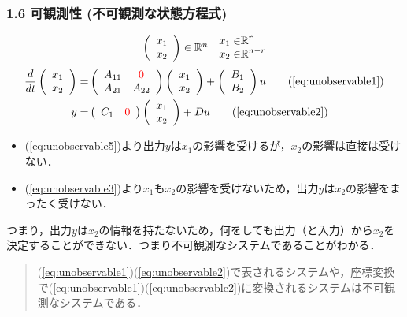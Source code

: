 \begin{frame}[t]
\frametitle{1.6 可観測性 (不可観測な状態方程式)}

\begin{align}
  \begin{array}{cc}
    \left(
      \begin{array}{c}
         x_1 \\  x_2
      \end{array}
    \right)\in \mathbb{R}^{n} &
    \begin{aligned}
       x_1 \in& \mathbb{R}^r \\
       x_2 \in& \mathbb{R}^{n-r} \\
    \end{aligned}
  \end{array} \notag
\end{align}
\begin{align}
  \frac{d}{dt}
  \left(
    \begin{array}{c}
      x_1 \\ x_2
    \end{array}
  \right) =& \left(
    \begin{array}{cc}
      A_{11} & \textcolor{red}{0} \\ A_{21} & A_{22}
    \end{array}
  \right)
  \left(
    \begin{array}{c}
      x_1 \\ x_2
    \end{array}
  \right) +
  \left(
    \begin{array}{c}
      B_1 \\ B_2
    \end{array}
  \right) u \tag{\ref{eq:unobservable1}}\\
  y =& \left(
    \begin{array}{cc}
      C_1 & \textcolor{red}{0}
    \end{array}
  \right)
  \left(
    \begin{array}{c}
      x_1 \\ x_2
    \end{array}
  \right) + D u \tag{\ref{eq:unobservable2}}
\end{align}
\begin{itemize}
\item (\ref{eq:unobservable5})より出力$y$は$x_1$の影響を受けるが，$x_2$の影響は直接は受けない．
\item (\ref{eq:unobservable3})より$x_1$も$x_2$の影響を受けないため，出力$y$は$x_2$の影響をまったく受けない．
\end{itemize}
つまり，出力$y$は$x_2$の情報を持たないため，何をしても出力（と入力）から$x_2$を決定することができない．つまり不可観測なシステムであることがわかる．
\begin{quote}
(\ref{eq:unobservable1})(\ref{eq:unobservable2})で表されるシステムや，座標変換で(\ref{eq:unobservable1})(\ref{eq:unobservable2})に変換されるシステムは不可観測なシステムである．
\end{quote}
\addtocounter{figure}{+1}
\end{frame}


